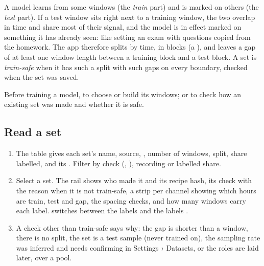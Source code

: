 \begin{plainterms}
A model learns from some windows (the \emph{train} part) and is marked on others (the
\emph{test} part). If a test window sits right next to a training window, the two overlap in
time and share most of their signal, and the model is in effect marked on something it has
already seen: like setting an exam with questions copied from the homework. The app therefore
splits by time, in blocks (a ), and leaves a gap of at least
one window length between a training block and a test block. A set is \emph{train-safe} when it
has such a split with such gaps on every boundary, checked when the set was saved.
\end{plainterms}

Before training a model, to choose or build its windows; or to check how an existing set was
made and whether it is safe.


\subsection{Read a set}\label{sec:library-read-set}
\begin{enumerate}
  \item The table gives each set's name, source, , number of
    windows, split, share labelled, and its . Filter by check (,
    ), recording or labelled share.
  \item Select a set. The rail shows who made it and its recipe hash, its check with the
    reason when it is not train-safe, a strip per channel showing which hours are train, test
    and gap, the spacing checks, and how many windows carry each label. 
    switches between the labels  and the labels .
  \item A check other than train-safe says why: the gap is shorter than a window, there is no
    split, the set is a test sample (never trained on), the sampling rate was inferred and
    needs confirming in Settings › Datasets, or the roles are laid later, over a pool.
\end{enumerate}

